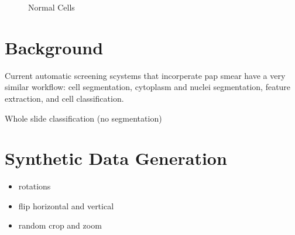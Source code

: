 \documentclass[ms,electronic,oneside,twosidetoc,letterpaper,chaptercenter,parttop]{byumsphd}
\begin{document}
\begin{figure}[H]
  \centering
   \quad
   \quad
  \caption{Normal Cells}
\end{figure}


\chapter{Background}

Current automatic screening scystems that incorperate pap smear have a very similar workflow: cell segmentation, cytoplasm and nuclei segmentation, feature extraction, and cell classification.

Whole slide classification (no segmentation) \cite{kiran}

\chapter{Synthetic Data Generation}

\begin{itemize}
  \item rotations
  \item flip horizontal and vertical
  \item random crop and zoom
\end{itemize}
\end{document}
